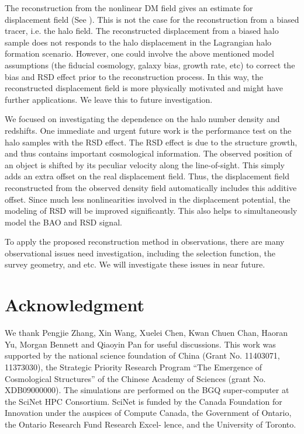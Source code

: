 \documentclass[iop]{emulateapj}
\begin{document}
{The reconstruction from the nonlinear DM field gives an estimate for displacement field (See \cite{zhuhm16c}).
This is not the case for the reconstruction from a biased tracer, i.e. the halo field.
The reconstructed displacement from a biased halo sample does not responds to the halo displacement in the Lagrangian halo formation scenario.
However, one could involve the above mentioned model assumptions (the fiducial cosmology, galaxy bias, growth rate, etc) to correct the bias and RSD effect prior to the reconstruction process.
In this way, the reconstructed displacement field is more physically motivated and might have further applications.
We leave this to future investigation.

We focused on investigating the dependence on the halo number density and redshifts.
One immediate and urgent future work is the performance test on the halo samples with the RSD effect.
The RSD effect is due to the structure growth, and thus contains important cosmological information.
The observed position of an object is shifted by its peculiar velocity along the line-of-sight.
This simply adds an extra offset on the real displacement field. 
Thus, the displacement field reconstructed from the observed density field automatically includes this additive offset. 
Since much less nonlinearities involved in the displacement potential, the modeling of RSD will be improved significantly.
This also helps to simultaneously model the BAO and RSD signal.

To apply the proposed reconstruction method in observations, there are many observational issues need investigation, including the selection function, the survey geometry, and etc.
We will investigate these issues in near future.

\section*{Acknowledgment}
We thank Pengjie Zhang, Xin Wang, Xuelei Chen, Kwan Chuen Chan, Haoran Yu, Morgan Bennett and Qiaoyin Pan for useful discussions.
This work was supported by the national science foundation of China (Grant No. 11403071, 11373030),
the Strategic Priority Research Program ``The Emergence of Cosmological Structures'' of the Chinese Academy of Sciences (grant No. XDB09000000).
The simulations are performed on the BGQ super-computer at the SciNet HPC Consortium. SciNet is funded by the Canada Foundation for Innovation under the auspices of Compute Canada, the Government of Ontario, the Ontario Research Fund Research Excel- lence, and the University of Toronto. 

}
\end{document}
